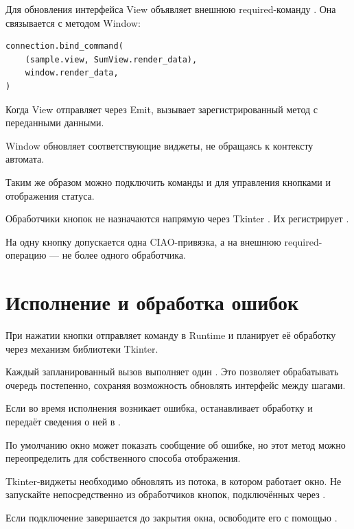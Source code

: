 Для обновления интерфейса View объявляет внешнюю
required-команду . Она связывается
с методом Window:

\begin{lstlisting}[language=Python,numbers=none]
connection.bind_command(
    (sample.view, SumView.render_data),
    window.render_data,
)
\end{lstlisting}

Когда View отправляет  через Emit,
 вызывает зарегистрированный
метод  с переданными
данными.

Window обновляет соответствующие виджеты,
не обращаясь к контексту автомата.

Таким же образом можно подключить команды
 и 
для управления кнопками и отображения статуса.

\begin{importantbox}
Обработчики кнопок не назначаются напрямую через
Tkinter . Их регистрирует
.

На одну кнопку допускается одна CIAO-привязка,
а на внешнюю required-операцию --- не более
одного обработчика.
\end{importantbox}


\section{Исполнение и обработка ошибок}

При нажатии кнопки  отправляет
команду в Runtime и планирует её обработку через
механизм  библиотеки Tkinter.

Каждый запланированный вызов выполняет один
. Это позволяет обрабатывать
очередь постепенно, сохраняя возможность
обновлять интерфейс между шагами.

Если во время исполнения возникает ошибка,
 останавливает обработку
и передаёт сведения о ней в
.

По умолчанию окно может показать сообщение об ошибке,
но этот метод можно переопределить для собственного
способа отображения.

\begin{notebox}
Tkinter-виджеты необходимо обновлять из потока,
в котором работает окно. Не запускайте
 непосредственно из обработчиков
кнопок, подключённых через .

Если подключение завершается до закрытия окна,
освободите его с помощью .
\end{notebox}
